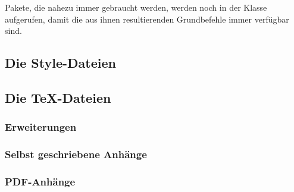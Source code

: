 Pakete, die nahezu immer gebraucht werden, werden noch in der Klasse aufgerufen, damit die aus ihnen resultierenden Grundbefehle immer verfügbar sind.

\subsection{Die Style-Dateien}
\label{subsec:StyleDateien}

\subsection{Die \TeX-Dateien}
\label{subsec:TeXDateien}
\subsubsection{Erweiterungen}
\label{subsec:TeXDateienErweiterungen}
\subsubsection{Selbst geschriebene Anhänge}
\label{subsec:TeXDateienEigeneAnhänge}
\subsubsection{PDF-Anhänge}
\label{subsec:TeXDateienPDFAnhänge}